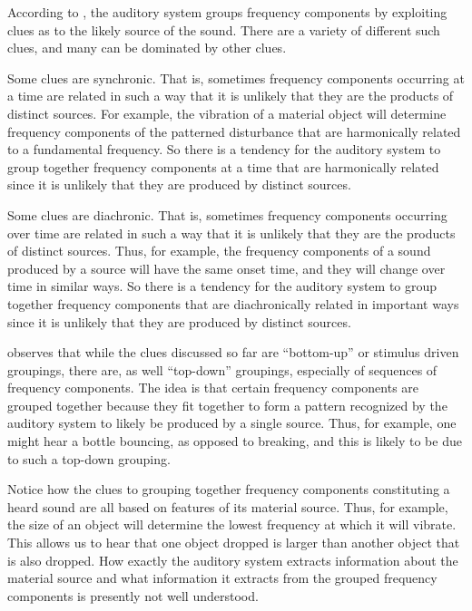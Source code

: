 According to \citet{Nudds:2009sf,Nudds:2010aa}, the auditory system groups frequency components by exploiting clues as to the likely source of the sound. There are a variety of different such clues, and many can be dominated by other clues. 

Some clues are synchronic. That is, sometimes frequency components occurring at a time are related in such a way that it is unlikely that they are the products of distinct sources. For example, the vibration of a material object will determine frequency components of the patterned disturbance that are harmonically related to a fundamental frequency. So there is a tendency for the auditory system to group together frequency components at a time that are harmonically related since it is unlikely that they are produced by distinct sources. 

Some clues are diachronic. That is, sometimes frequency components occurring over time are related in such a way that it is unlikely that they are the products of distinct sources. Thus, for example, the frequency components of a sound produced by a source will have the same onset time, and they will change over time in similar ways. So there is a tendency for the auditory system to group together frequency components that are diachronically related in important ways since it is unlikely that they are produced by distinct sources. 

\citet[74]{Nudds:2009sf} observes that while the clues discussed so far are ``bottom-up'' or stimulus driven groupings, there are, as well ``top-down'' groupings, especially of sequences of frequency components. The idea is that certain frequency components are grouped together because they fit together to form a pattern recognized by the auditory system to likely be produced by a single source. Thus, for example, one might hear a bottle bouncing, as opposed to breaking, and this is likely to be due to such a top-down grouping.

Notice how the clues to grouping together frequency components constituting a heard sound are all based on features of its material source. Thus, for example, the size of an  object will determine the lowest frequency at which it will vibrate. This allows us to hear that one object dropped is larger than another object that is also dropped. How exactly the auditory system extracts information about the material source and what information it extracts from the grouped frequency components is presently not well understood. 

